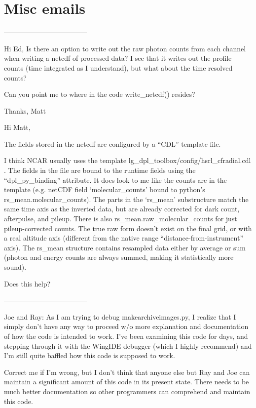 \chapter{Misc emails}
\label{SECTION-Misc}


------------------------------------


Hi Ed,
Is there an option to write out the raw photon counts from each channel when writing a netcdf of processed data?  I see that it writes out the profile counts (time integrated as I understand), but what about the time resolved counts?

Can you point me to where in the code write\_netcdf() resides?

Thanks,
Matt
\newline
\newline

Hi Matt,

The fields stored in the netcdf are configured by a “CDL” template file.

I think NCAR usually uses the template lg\_dpl\_toolbox/config/hsrl\_cfradial.cdl . The fields in the file are bound to the runtime fields using the “dpl\_py\_binding” attribute.  It does look to me like the counts are in the template (e.g. netCDF field ‘molecular\_counts' bound to python's rs\_mean.molecular\_counts).  The parts in the ‘rs\_mean’ substructure match the same time axis as the inverted data, but are already corrected for dark count, afterpulse, and pileup. There is also rs\_mean.raw\_molecular\_counts for just pileup-corrected counts. The true raw form doesn’t exist on the final grid, or with a real altitude axis (different from the native range “distance-from-instrument” axis). The rs\_mean structure contains resampled data either by average or sum (photon and energy counts are always summed, making it statistically more sound).

Does this help?

------------------------------------


Joe and Ray:
As I am trying to debug makearchiveimages.py, I realize that I simply don’t have any way to proceed w/o more explanation and documentation of how the code is intended to work.
I’ve been examining this code for days, and stepping through it with the WingIDE debugger (which I highly recommend) and I’m still quite baffled how this code is supposed to work.

Correct me if I’m wrong, but I don’t think that anyone else but Ray and Joe can maintain a significant amount of this code in its present state.  There needs to be much better documentation so other programmers can comprehend and maintain this code.

